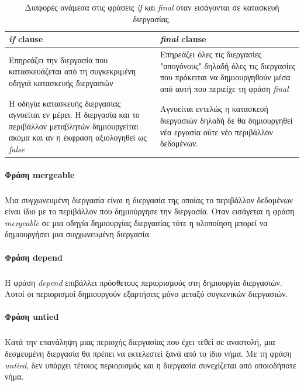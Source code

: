 \documentclass[12pt]{article}
\newcommand{\en}[1]{\foreignlanguage{english}{#1}}
\begin{document}
\begin{table}[htbp]
\captionsetup{justification=raggedright,
singlelinecheck=false
}
\caption{Διαφορές ανάμεσα στις φράσεις \emph{\en{if}} και \emph{\en{final}} οταν εισάγονται σε κατασκευή διεργασίας.}
\def\arraystretch{1.5}
\begin{tabular}{| p{} | p{}|}
\textbf{\en{\emph{if} clause}} \cellcolor[HTML]{D0D0D0} & \textbf{\en{\emph{final} clause}} \cellcolor[HTML]{D0D0D0} \\
\hline
Επηρεάζει την διεργασία που κατασκευάζεται από τη συγκεκριμένη οδηγιά κατασκευής διεργασιών & Επηρεάζει όλες τις διεργασίες "απογόνους" δηλαδή όλες τις διεργασίες που πρόκειται να δημιουργηθούν μέσα από αυτή που περιείχε τη φράση \emph{\en{final}}\\
\hline
Η οδηγία κατασκευής διεργασίας αγνοείται εν μέρει. Η διεργασία και το περιβάλλον μεταβλητών δημιουργείται ακόμα και αν η έκφραση αξιολογηθεί ως \emph{\en{false}} & Αγνοείται εντελώς η κατασκευή διεργασιών δηλαδή δε θα δημιουργηθεί νέα εργασία ούτε νέο περιβάλλον δεδομένων.	\\
\hline
\end{tabular}
\end{table}

\paragraph{Φράση \en{mergeable}}
\subparagraph{}

Μια συγχωνευμένη διεργασία είναι η διεργασία της οποίας το περιβάλλον δεδομένων είναι ίδιο με το περιβάλλον που δημιούργησε την διεργασία. Οταν εισάγεται η φράση \emph{\en{mergeable}} σε μια οδηγία δημιουργίας διεργασίας τότε η υλοποίηση μπορεί να δημιουργήσει μια συγχωνευμένη διεργασία.

\paragraph{Φράση \en{depend}}
\subparagraph{}

Η φράση \emph{\en{depend}} επιβάλλει πρόσθετους περιορισμούς στη δημιουργία διεργασιών. Αυτοί οι περιορισμοί δημιουργούν εξαρτήσεις μόνο μεταξύ συγκενικών διεργασιών.
\clearpage

\paragraph{Φράση \en{untied}}
\subparagraph{}
Κατά την επανάληψη μιας περιοχής διεργασίας που έχει τεθεί σε αναστολή, μια δεσμευμένη διεργασία θα πρέπει να εκτελεστεί ξανά από το ίδιο νήμα. Με τη φράση \emph{\en{untied}}, δεν υπάρχει τέτοιος περιορισμός και η διεργασία συνεχίζεται από οποιοδήποτε νήμα.
\end{document}
